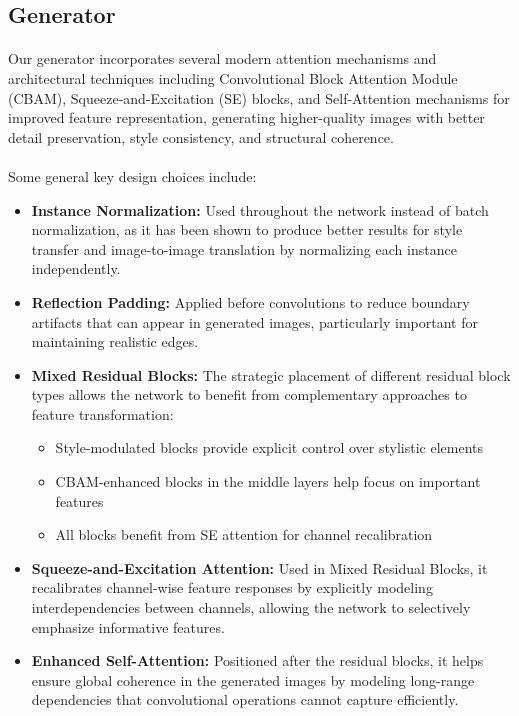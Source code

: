 \documentclass[twoside,english,notitlepage]{report}
\begin{document}
\subsection{Generator}
\paragraph{} Our generator incorporates several modern attention mechanisms and architectural techniques including Convolutional Block Attention Module (CBAM), Squeeze-and-Excitation (SE) blocks, and Self-Attention mechanisms for improved feature representation, generating higher-quality images with better detail preservation, style consistency, and structural coherence.

\paragraph{} Some general key design choices include:
\begin{itemize}
    \item \textbf{Instance Normalization:} Used throughout the network instead of batch normalization, as it has been shown to produce better results for style transfer and image-to-image translation by normalizing each instance independently.

    \item \textbf{Reflection Padding:} Applied before convolutions to reduce boundary artifacts that can appear in generated images, particularly important for maintaining realistic edges.

    \item \textbf{Mixed Residual Blocks:} The strategic placement of different residual block types allows the network to benefit from complementary approaches to feature transformation:

    \begin{itemize}
        \item Style-modulated blocks provide explicit control over stylistic elements
        \item CBAM-enhanced blocks in the middle layers help focus on important features
        \item All blocks benefit from SE attention for channel recalibration
    \end{itemize}

    \item \textbf{Squeeze-and-Excitation Attention:} Used in Mixed Residual Blocks, it recalibrates channel-wise feature responses by explicitly modeling interdependencies between channels, allowing the network to selectively emphasize informative features.

    \item \textbf{Enhanced Self-Attention:} Positioned after the residual blocks, it helps ensure global coherence in the generated images by modeling long-range dependencies that convolutional operations cannot capture efficiently.

\end{itemize}
\end{document}
